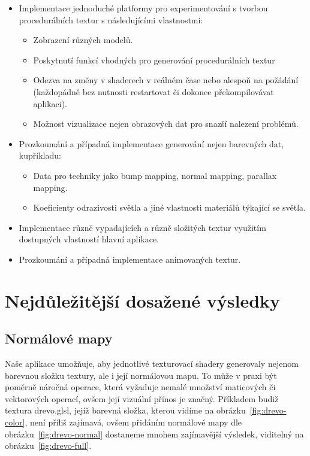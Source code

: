 \documentclass[12pt,a4paper,titlepage,final]{report}
\begin{document}
\begin{itemize}
	\item Implementace jednoduché platformy pro experimentování s tvorbou procedurálních textur s následujícími vlastnostmi:
	\begin{itemize}
		\item Zobrazení různých modelů.
		\item Poskytnutí funkcí vhodných pro generování procedurálních textur
		\item Odezva na změny v shaderech v reálném čase nebo alespoň na požádání (každopádně bez nutnosti restartovat či dokonce překompilovávat aplikaci).
		\item Možnost vizualizace nejen obrazových dat pro snazší nalezení problémů.
	\end{itemize}
	\item Prozkoumání a případná implementace generování nejen barevných dat, kupříkladu:
	\begin{itemize}
		\item Data pro techniky jako bump mapping, normal mapping, parallax mapping.
		\item Koeficienty odrazivosti světla a jiné vlastnosti materiálů týkající se světla.
	\end{itemize}
	\item Implementace různě vypadajících a různě složitých textur využitím dostupných vlastností hlavní aplikace.
	\item Prozkoumání a případná implementace animovaných textur.
\end{itemize}

\chapter{Nejdůležitější dosažené výsledky}

\section{Normálové mapy}

Naše aplikace umožňuje, aby jednotlivé texturovací shadery generovaly nejenom barevnou složku textury, ale i její normálovou mapu. To může v praxi být poměrně náročná operace, která vyžaduje nemalé množství maticových či vektorových operací, ovšem její vizuální přínos je značný. Příkladem budiž textura drevo.glsl, jejíž barevná složka, kterou vidíme na obrázku~\ref{fig:drevo-color}, není příliš zajímavá, ovšem přidáním normálové mapy dle obrázku~\ref{fig:drevo-normal} dostaneme mnohem zajímavější výsledek, viditelný na obrázku~\ref{fig:drevo-full}.
\end{document}
